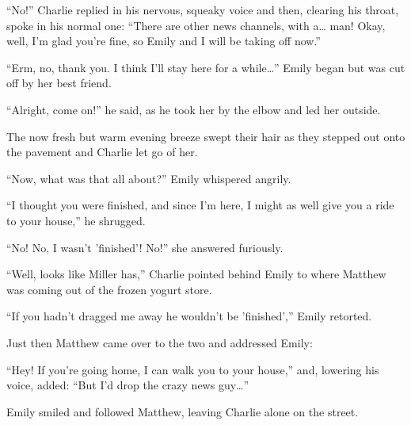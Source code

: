 “No!” Charlie replied in his nervous, squeaky voice and then, clearing his throat, spoke in his normal one: “There are other news channels, with a… man! Okay, well, I'm glad you're fine, so Emily and I will be taking off now.”

“Erm, no, thank you. I think I'll stay here for a while…” Emily began but was cut off by her best friend.

“Alright, come on!” he said, as he took her by the elbow and led her outside.

The now fresh but warm evening breeze swept their hair as they stepped out onto the pavement and Charlie let go of her.

“Now, what was that all about?” Emily whispered angrily.

“I thought you were finished, and since I'm here, I might as well give you a ride to your house,” he shrugged.

“No! No, I wasn't 'finished'! No!” she answered furiously.

“Well, looks like Miller has,” Charlie pointed behind Emily to where Matthew was coming out of the frozen yogurt store.

“If you hadn't dragged me away he wouldn't be 'finished',” Emily retorted.

Just then Matthew came over to the two and addressed Emily:

“Hey! If you're going home, I can walk you to your house,” and, lowering his voice, added: “But I'd drop the crazy news guy…”

Emily smiled and followed Matthew, leaving Charlie alone on the street.